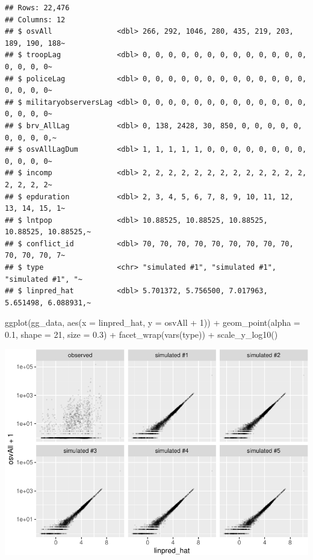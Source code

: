 \documentclass[
]{book}
\newenvironment{Shaded}{\begin{snugshade}}{\end{snugshade}}
\newcommand{\AttributeTok}[1]{\textcolor[rgb]{0.77,0.63,0.00}{#1}}
\newcommand{\DecValTok}[1]{\textcolor[rgb]{0.00,0.00,0.81}{#1}}
\newcommand{\FloatTok}[1]{\textcolor[rgb]{0.00,0.00,0.81}{#1}}
\newcommand{\FunctionTok}[1]{\textcolor[rgb]{0.00,0.00,0.00}{#1}}
\newcommand{\NormalTok}[1]{#1}
\newcommand{\SpecialCharTok}[1]{\textcolor[rgb]{0.00,0.00,0.00}{#1}}
\begin{document}
\begin{verbatim}
## Rows: 22,476
## Columns: 12
## $ osvAll               <dbl> 266, 292, 1046, 280, 435, 219, 203, 189, 190, 188~
## $ troopLag             <dbl> 0, 0, 0, 0, 0, 0, 0, 0, 0, 0, 0, 0, 0, 0, 0, 0, 0~
## $ policeLag            <dbl> 0, 0, 0, 0, 0, 0, 0, 0, 0, 0, 0, 0, 0, 0, 0, 0, 0~
## $ militaryobserversLag <dbl> 0, 0, 0, 0, 0, 0, 0, 0, 0, 0, 0, 0, 0, 0, 0, 0, 0~
## $ brv_AllLag           <dbl> 0, 138, 2428, 30, 850, 0, 0, 0, 0, 0, 0, 0, 0, 0,~
## $ osvAllLagDum         <dbl> 1, 1, 1, 1, 1, 0, 0, 0, 0, 0, 0, 0, 0, 0, 0, 0, 0~
## $ incomp               <dbl> 2, 2, 2, 2, 2, 2, 2, 2, 2, 2, 2, 2, 2, 2, 2, 2, 2~
## $ epduration           <dbl> 2, 3, 4, 5, 6, 7, 8, 9, 10, 11, 12, 13, 14, 15, 1~
## $ lntpop               <dbl> 10.88525, 10.88525, 10.88525, 10.88525, 10.88525,~
## $ conflict_id          <dbl> 70, 70, 70, 70, 70, 70, 70, 70, 70, 70, 70, 70, 7~
## $ type                 <chr> "simulated #1", "simulated #1", "simulated #1", "~
## $ linpred_hat          <dbl> 5.701372, 5.756500, 7.017963, 5.651498, 6.088931,~
\end{verbatim}

\begin{Shaded}
\begin{Highlighting}[]
\FunctionTok{ggplot}\NormalTok{(gg\_data, }\FunctionTok{aes}\NormalTok{(}\AttributeTok{x =}\NormalTok{ linpred\_hat, }\AttributeTok{y =}\NormalTok{ osvAll }\SpecialCharTok{+} \DecValTok{1}\NormalTok{)) }\SpecialCharTok{+} 
  \FunctionTok{geom\_point}\NormalTok{(}\AttributeTok{alpha =} \FloatTok{0.1}\NormalTok{, }\AttributeTok{shape =} \DecValTok{21}\NormalTok{, }\AttributeTok{size =} \FloatTok{0.3}\NormalTok{) }\SpecialCharTok{+} 
  \FunctionTok{facet\_wrap}\NormalTok{(}\FunctionTok{vars}\NormalTok{(type)) }\SpecialCharTok{+} 
  \FunctionTok{scale\_y\_log10}\NormalTok{()}
\end{Highlighting}
\end{Shaded}

\includegraphics{03-03-poisson-model_files/figure-latex/unnamed-chunk-4-1.pdf}
\end{document}
